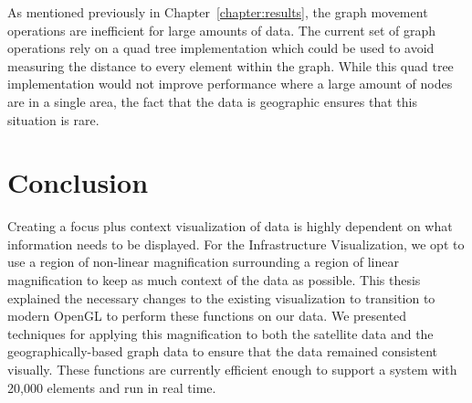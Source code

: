 As mentioned previously in Chapter~\ref{chapter:results}, the graph movement operations are inefficient for large amounts of data. The current set of graph operations rely on a quad tree implementation which could be used to avoid measuring the distance to every element within the graph. While this quad tree implementation would not improve performance where a large amount of nodes are in a single area, the fact that the data is geographic ensures that this situation is rare.

\section{Conclusion}
\label{section:conclusion}

Creating a focus plus context visualization of data is highly dependent on what information needs to be displayed. For the Infrastructure Visualization, we opt to use a region of non-linear magnification surrounding a region of linear magnification to keep as much context of the data as possible. This thesis explained the necessary changes to the existing visualization to transition to modern OpenGL to perform these functions on our data. We presented techniques for applying
this magnification to both the satellite data and the geographically-based graph data to ensure that the data remained consistent visually. These functions are currently
efficient enough to support a system with 20,000 elements and run in real time.

